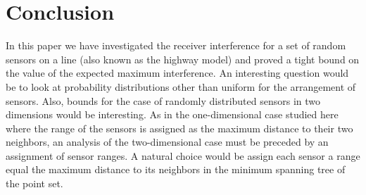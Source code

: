 \documentclass{patmorin}
\begin{document}
\section{Conclusion}

In this paper we have investigated the receiver interference for
a set of random sensors on a line (also known as the highway model)
and proved a tight bound on the value of the expected maximum
interference. An interesting question would be to look
at probability distributions other than uniform for the arrangement of sensors.
Also, bounds for the case of randomly distributed sensors in two dimensions
would be interesting. 
As in the one-dimensional case studied here where
the range of the sensors is assigned as the maximum distance to their two
neighbors, an analysis of the two-dimensional case must be preceded by
an assignment of sensor ranges. A natural choice would be assign each 
sensor a range equal the maximum distance to its neighbors in
the minimum spanning tree of the point set.




%

\end{document}
